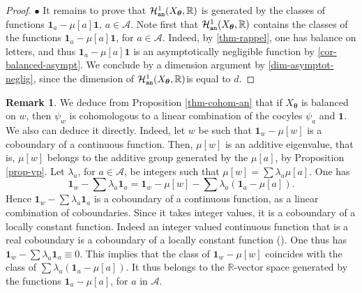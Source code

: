 \documentclass{article}
\theoremstyle{definition}
\newtheorem{remark}[lemma]{Remark}
\newcommand{\cH}{\mathcal{H}}
\newcommand{\btheta}{\boldsymbol{\theta}}
\begin{document}
\begin{proof}
 





 
 
 
 



 
 
  



 
 




$\bullet$  It remains to   prove that $\cH^1_{\tt an}(X_{\btheta},\mathbb R)$ is  generated  by the  classes of 
 functions 
 ${\mathbf 1}_a - \mu[a]{\mathbf 1}$,  $a \in {\mathcal A}$.
Note first that  $\cH^1_{\tt an}(X_{\btheta},\mathbb R)$ contains   the classes of the  functions 
${\mathbf 1}_a - \mu[a]{\mathbf 1}$, for  $a \in {\mathcal A}$. 
Indeed, by  \cref{thm-rappel}, one has balance on letters, and thus  ${\mathbf 1}_a  -  \mu[a]{\mathbf 1}$
is  an  asymptotically negligible function  by  \cref{cor-balanced-asympt}.
We conclude  by    a dimension argument  by  \cref{dim-asymptot-neglig}, since the dimension  of  $\cH^1_{\tt an}(X_{\btheta},\mathbb R)$is equal to $d$.

   \end{proof}
 
 

 \begin{remark} \label{rem:bal}
We deduce from Proposition \ref{thm-cohom-an} that if  $X_{\btheta} $ is balanced on $w$, then $\psi_w$ is cohomologous to a   linear   combination of the cocyles  $\psi_a$ and $\mathbf 1$.
We  also can deduce it directly.
Indeed, let $w$  be such that   ${\mathbf 1}_w - \mu[w]$ is  a coboundary of a continuous function.
Then,   $\mu[w]$ is an additive  eigenvalue, that is,
 $\mu[w]$ belongs to the additive  group  generated  by the $\mu[a]$, by Proposition \ref{prop-vp}. 
 Let $\lambda_a$,  for $ a \in  {\mathcal A}$,  be integers  such  that
 $\mu[w]= \sum \lambda_a \mu[a]$.
 One has
 $$   {\mathbf 1}_w - \sum  \lambda_a  {\mathbf 1}_a={\mathbf 1}_w - \mu[w] -  \sum \lambda_a ({\mathbf 1}_a- \mu[a]).$$
 Hence 
 $ {\mathbf 1}_w - \sum  \lambda_a  {\mathbf 1}_a$ is  a   coboundary of a  continuous  function,   as  a linear combination  of   coboundaries.
 Since it  takes integer values,  it is a coboundary of  a locally constant  function.
 Indeed  an  integer valued continuous function that is a real coboundary is a coboundary of a  locally constant  function  (\cite[Proposition 4.1]{Ormes:00}).
 One thus has $   {\mathbf 1}_w - \sum  \lambda_a  {\mathbf 1}_a\equiv 0$.
 This implies that   the class of  ${\mathbf 1}_w - \mu[w] $  coincides with the class  of $   \sum \lambda_a ({\mathbf 1}_a- \mu[a])$. It thus  belongs to  the 
  ${\mathbb R}$-vector space generated  by the 
 functions 
 ${\mathbf 1}_a - \mu[a]$, for $a $  in ${\mathcal A}$.

\end{remark}
\end{document}
